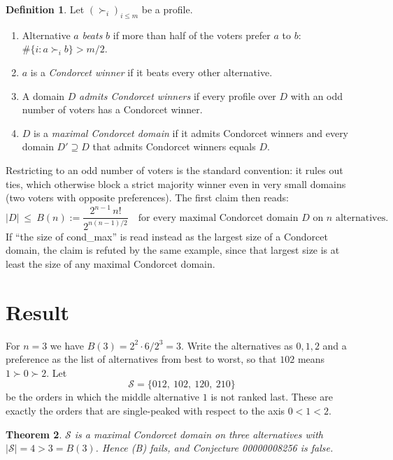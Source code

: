 \documentclass[11pt]{article}
\theoremstyle{plain}
\newtheorem{theorem}{Theorem}
\theoremstyle{definition}
\newtheorem{definition}[theorem]{Definition}
\theoremstyle{remark}
\newcommand{\SP}{\mathcal S}
\begin{document}
\begin{definition}
Let $(\succ_i)_{i\le m}$ be a profile.
\begin{enumerate}
\item Alternative $a$ \emph{beats} $b$ if more than half of the voters prefer $a$ to
  $b$: $\#\{i: a\succ_i b\}>m/2$.
\item $a$ is a \emph{Condorcet winner} if it beats every other alternative.
\item A domain $D$ \emph{admits Condorcet winners} if every profile over $D$ with an
  odd number of voters has a Condorcet winner.
\item $D$ is a \emph{maximal Condorcet domain} if it admits Condorcet winners and
  every domain $D'\supseteq D$ that admits Condorcet winners equals $D$.
\end{enumerate}
\end{definition}

Restricting to an odd number of voters is the standard convention: it rules out
ties, which otherwise block a strict majority winner even in very small domains
(two voters with opposite preferences). The first claim then reads:
\begin{equation}\label{eq:bound}
|D|\ \le\ B(n):=\frac{2^{n-1}\,n!}{2^{n(n-1)/2}}
\quad\text{for every maximal Condorcet domain $D$ on $n$ alternatives.}
\tag{B}
\end{equation}
If ``the size of cond\_max'' is read instead as the largest size of a Condorcet
domain, the claim is refuted by the same example, since that largest size is at least
the size of any maximal Condorcet domain.

\section{Result}

For $n=3$ we have $B(3)=2^2\cdot 6/2^3=3$. Write the alternatives as $0,1,2$ and a
preference as the list of alternatives from best to worst, so that $102$ means
$1\succ0\succ2$. Let
\[
\SP=\{012,\ 102,\ 120,\ 210\}
\]
be the orders in which the middle alternative $1$ is not ranked last. These are
exactly the orders that are single-peaked with respect to the axis $0<1<2$.

\begin{theorem}\label{thm:main}
$\SP$ is a maximal Condorcet domain on three alternatives with $|\SP|=4>3=B(3)$.
Hence (B) fails, and Conjecture 00000008256 is false.
\end{theorem}
\end{document}
